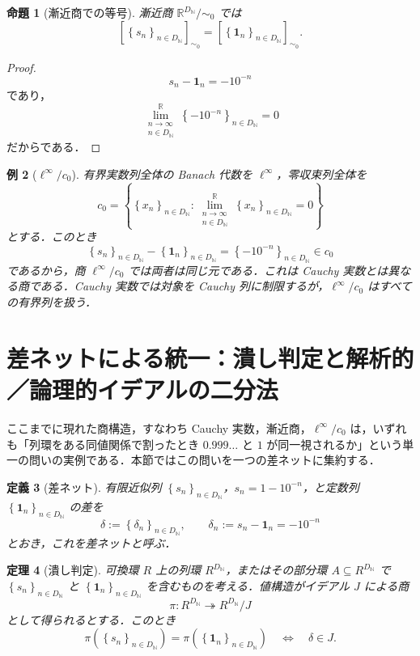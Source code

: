 \documentclass[a4paper,11pt]{ltjsarticle}
\theoremstyle{jpdef}
\newtheorem{definition}{定義}[section]
\newtheorem{example}[definition]{例}
\theoremstyle{jpthm}
\newtheorem{theorem}[definition]{定理}
\newtheorem{proposition}[definition]{命題}
\newcommand{\N}{\mathbb{N}}
\newcommand{\R}{\mathbb{R}}
\newcommand{\DN}{D_{\N}}
\newcommand{\set}[1]{\left\{#1\right\}}
\newcommand{\seq}[2]{\left\{#1\right\}_{#2}}
\begin{document}
\begin{proposition}[漸近商での等号]
漸近商 \(\R^{\DN}/\sim_0\) では
\[
  [\seq{s_n}{n\in\DN}]_{\sim_0}
  =[\seq{\mathbf1_n}{n\in\DN}]_{\sim_0}.
\]
\end{proposition}

\begin{proof}
\[
  s_n-\mathbf1_n=-10^{-n}
\]
であり，
\[
  \lim_{\substack{n\to\infty\\ n\in\DN}}^{\R}\seq{-10^{-n}}{n\in\DN}=0
\]
だからである．
\end{proof}

\begin{example}[\(\ell^\infty/c_0\)]
有界実数列全体の Banach 代数を \(\ell^\infty\)，零収束列全体を
\[
  c_0=\set{\seq{x_n}{n\in\DN}:\lim_{\substack{n\to\infty\\ n\in\DN}}^{\R}\seq{x_n}{n\in\DN}=0}
\]
とする．このとき
\[
  \seq{s_n}{n\in\DN}-\seq{\mathbf1_n}{n\in\DN}=\seq{-10^{-n}}{n\in\DN}\in c_0
\]
であるから，商 \(\ell^\infty/c_0\) では両者は同じ元である．これは Cauchy 実数とは異なる商である．Cauchy 実数では対象を Cauchy 列に制限するが，\(\ell^\infty/c_0\) はすべての有界列を扱う．
\end{example}



\section{差ネットによる統一：潰し判定と解析的／論理的イデアルの二分法}

ここまでに現れた商構造，すなわち Cauchy 実数，漸近商，\(\ell^\infty/c_0\) は，いずれも「列環をある同値関係で割ったとき \(0.999\ldots\) と \(1\) が同一視されるか」という単一の問いの実例である．本節ではこの問いを一つの差ネットに集約する．

\begin{definition}[差ネット]
有限近似列 \(\seq{s_n}{n\in\DN}\)，\(s_n=1-10^{-n}\)，と定数列 \(\seq{\mathbf1_n}{n\in\DN}\) の差を
\[
  \delta:=\seq{\delta_n}{n\in\DN},
  \qquad
  \delta_n:=s_n-\mathbf1_n=-10^{-n}
\]
とおき，これを差ネットと呼ぶ．
\end{definition}

\begin{theorem}[潰し判定]
可換環 \(R\) 上の列環 \(R^{\DN}\)，またはその部分環 \(A\subseteq R^{\DN}\) で \(\seq{s_n}{n\in\DN}\) と \(\seq{\mathbf1_n}{n\in\DN}\) を含むものを考える．値構造がイデアル \(J\) による商
\[
  \pi:R^{\DN}\twoheadrightarrow R^{\DN}/J
\]
として得られるとする．このとき
\[
  \pi(\seq{s_n}{n\in\DN})=\pi(\seq{\mathbf1_n}{n\in\DN})
  \quad\Longleftrightarrow\quad
  \delta\in J.
\]
\end{theorem}
\end{document}
